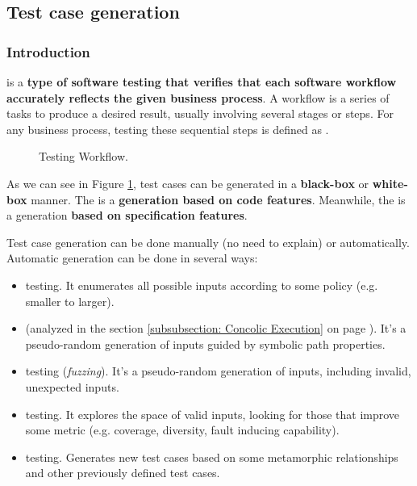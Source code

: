 \subsection{Test case generation}

\subsubsection{Introduction}

 is a \textbf{type of software testing that verifies that each software workflow accurately reflects the given business process}. A workflow is a series of tasks to produce a desired result, usually involving several stages or steps. For any business process, testing these sequential steps is defined as .

\begin{figure}[!htp]
    \centering
    \caption{Testing Workflow.}
    \label{fig: Testing Workflow}
\end{figure}

\noindent
As we can see in Figure \ref{fig: Testing Workflow}, test cases can be generated in a \textbf{black-box} or \textbf{white-box} manner. The  is a \textbf{generation based on code features}. Meanwhile, the  is a generation \textbf{based on specification features}.

\highspace
Test case generation can be done manually (no need to explain) or automatically. Automatic generation can be done in several ways:
\begin{itemize}
    \item {} testing. It enumerates all possible inputs according to some policy (e.g. smaller to larger).
    
    \item {} (analyzed in the section \ref{subsubsection: Concolic Execution} on page \pageref{subsubsection: Concolic Execution}). It's a pseudo-random generation of inputs guided by symbolic path properties.
    
    \item {} testing (\emph{fuzzing}). It's a pseudo-random generation of inputs, including invalid, unexpected inputs.
    
    \item {} testing. It explores the space of valid inputs, looking for those that improve some metric (e.g. coverage, diversity, fault inducing capability).
    
    \item {} testing. Generates new test cases based on some metamorphic relationships and other previously defined test cases.
\end{itemize}

